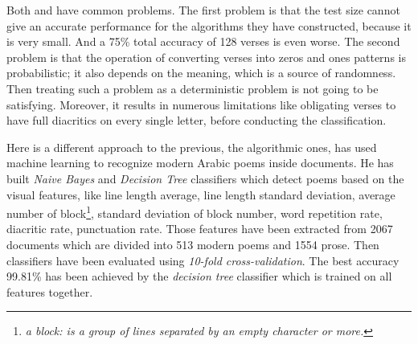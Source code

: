 \documentclass[12pt]{report}
\begin{document}
Both \citet{Abuata} and \citet{Alnagdawi2013} have common problems.  The first
problem is that the test size cannot give an accurate performance for the algorithms
they have constructed, because it is very small. And a 75\% total accuracy of 128
verses is even worse.
The second problem is that the operation of converting verses into zeros and ones
patterns is probabilistic; it also depends on the meaning, which is a source of
randomness.  Then treating such a problem as a deterministic problem is
not going to be satisfying. Moreover, it results in numerous limitations
like obligating verses to have full diacritics on every single letter, before
conducting the classification.


Here is a different approach to the previous, the algorithmic ones,
\citet{Almuhareb2015} has used machine learning to recognize modern Arabic poems
inside documents.  He has built \textit{Naive Bayes} and \textit{Decision Tree}
classifiers which detect poems based on the visual features, like line
length average, line length standard deviation, average number of block\footnote{
\textit{a block: is a group of lines separated by an empty character or more.}}, standard
deviation of block number, word repetition rate, diacritic rate, punctuation
rate. Those features have been extracted from 2067 documents which are
divided into 513 modern poems and 1554 prose.
Then classifiers have been evaluated using \textit{10-fold cross-validation}. 
The best accuracy 99.81\% has been achieved by the \textit{decision tree}
classifier which is trained on all features together.
\end{document}
